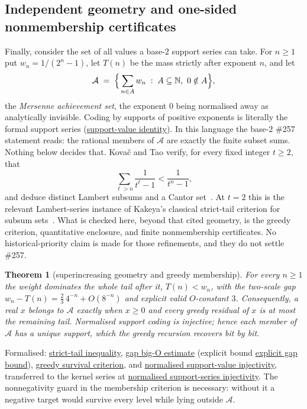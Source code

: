 \documentclass[11pt]{article}
\newcommand{\commit}{312b96c0d149ed466725c62d4ef24cfc91bca34e}
\newcommand{\repobase}{https://github.com/wcook04/plectis-lean-erdos249-257/blob/\commit}
\newcommand{\PK}{Erdos249257}
\newcommand{\lword}[4]{\href{\repobase/\PK/#1\#L#2}{#4}}
\newtheorem{theorem}{Theorem}[section]
\theoremstyle{definition}
\theoremstyle{remark}
\newcommand{\N}{\mathbb{N}}
\begin{document}
\subsection{Independent geometry and one-sided nonmembership certificates}
\label{app:carry-geometry}

Finally, consider the set of all values a base-$2$ support series can
take. For $n\ge1$ put $w_n=1/(2^n-1)$, let $T(n)$ be the mass strictly after
exponent $n$, and let
\[
\mathcal A\;=\;\Bigl\{\,\sum_{n\in A}w_n \;:\; A\subseteq\N,\ 0\notin A\Bigr\},
\]
the \emph{Mersenne achievement set}, the exponent $0$ being normalised away as
analytically invisible. Coding by supports of positive exponents is literally
the formal support series
(\lword{GreedyAchievementSet.lean}{554}{positiveMersenneSupportValue_eq_erdosSupportSeries}{support-value identity}). In
this language the base-$2$ \#257 statement reads: the rational members of
$\mathcal A$ are exactly the finite subset sums. Nothing below decides that.
Kova\v{c} and Tao verify, for every fixed integer $t\ge2$, that
\[
  \sum_{\ell>n}\frac1{t^\ell-1}<\frac1{t^n-1},
\]
and deduce distinct Lambert subsums and a Cantor set~\cite[Remark~4.1]{kovactao}. At
$t=2$ this is the relevant Lambert-series instance of Kakeya's classical
strict-tail criterion for subsum sets~\cite{kakeya1914}. What is checked here,
beyond that cited geometry, is the greedy criterion, quantitative enclosure,
and finite nonmembership certificates.  No historical-priority claim is made
for those refinements, and they do not settle \#257.

\begin{theorem}[superincreasing geometry and greedy membership]\label{res:greedy-details}
For every $n\ge1$ the weight dominates the whole tail after it, $T(n)<w_n$,
with the two-scale gap $w_n-T(n)=\tfrac23\,4^{-n}+O(8^{-n})$ and explicit
valid $O$-constant $3$. Consequently, a real $x$ belongs to $\mathcal A$
exactly when $x\ge0$ and every greedy residual of $x$ is at most the remaining
tail. Normalised support coding is injective; hence each member of $\mathcal A$
has a unique support, which the greedy recursion recovers bit by bit.
\end{theorem}
\noindent Formalised:
\lword{GreedyAchievementSet.lean}{180}{mersenneTail_lt_weight}{strict-tail inequality},
\lword{GreedyAchievementSet.lean}{473}{mersenneGap_isBigOWith}{gap big-O estimate} (explicit bound
\lword{GreedyAchievementSet.lean}{448}{mersenneGap_asymptotic_bound}{explicit gap bound}),
\lword{GreedyAchievementSet.lean}{1445}{mem_mersenneAchievementSet_iff_greedy_survival}{greedy survival criterion},
and
\lword{GreedyAchievementSet.lean}{1527}{positiveMersenneSupportValue_injective_normalized}{normalised support-value injectivity},
transferred to the kernel series at
\lword{GreedyAchievementSet.lean}{1536}{erdosSupportSeries_two_injective_normalized}{normalised support-series injectivity}.
The nonnegativity guard in the membership criterion is necessary: without it a
negative target would survive every level while lying outside $\mathcal A$.
\end{document}
